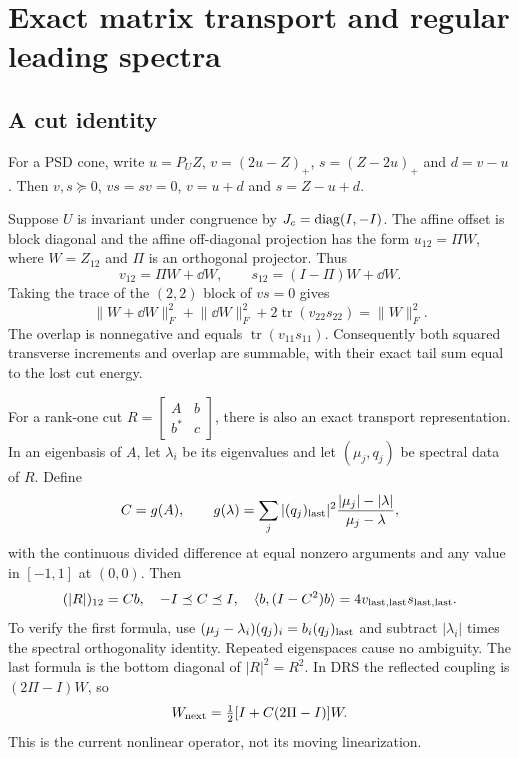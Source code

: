 \documentclass[11pt]{article}
\theoremstyle{remark}\newtheorem{remark}[theorem]{Remark}
\newcommand{\ip}[2]{\langle #1,#2\rangle}\newcommand{\norm}[1]{\lVert #1\rVert}
\newcommand{\tr}{\operatorname{tr}}\newcommand{\dist}{\operatorname{dist}}
\numberwithin{equation}{section}
\begin{document}
\section{Exact matrix transport and regular leading spectra}
\subsection{A cut identity}
For a PSD cone, write $u=P_UZ$, $v=(2u-Z)_+$, $s=(Z-2u)_+$ and $d=v-u$. Then $v,s\succeq0$, $vs=sv=0$, $v=u+d$ and $s=Z-u+d$.

Suppose $U$ is invariant under congruence by $J_c=\operatorname{diag}(I,-I)$. The affine offset is block diagonal and the affine off-diagonal projection has the form $u_{12}=\Pi W$, where $W=Z_{12}$ and $\Pi$ is an orthogonal projector. Thus
\[
 v_{12}=\Pi W+\dd W,\qquad s_{12}=(I-\Pi)W+\dd W.
\]
Taking the trace of the $(2,2)$ block of $vs=0$ gives
\begin{equation}\label{eq:cut}
 \norm{W+\dd W}_F^2+\norm{\dd W}_F^2
 +2\tr(v_{22}s_{22})=\norm W_F^2.
\end{equation}
The overlap is nonnegative and equals $\tr(v_{11}s_{11})$. Consequently both squared transverse increments and overlap are summable, with their exact tail sum equal to the lost cut energy.

For a rank-one cut $R=\left[\begin{smallmatrix}A&b\\b^*&c\end{smallmatrix}\right]$, there is also an exact transport representation. In an eigenbasis of $A$, let $\lambda_i$ be its eigenvalues and let $(\mu_j,q_j)$ be spectral data of $R$. Define
\[
 C=g(A),\qquad g(\lambda)=\sum_j |(q_j)_{\rm last}|^2
 \frac{|\mu_j|-|\lambda|}{\mu_j-\lambda},
\]
with the continuous divided difference at equal nonzero arguments and any value in $[-1,1]$ at $(0,0)$. Then
\begin{equation}\label{eq:transport}
 (|R|)_{12}=Cb,\quad -I\preceq C\preceq I,\quad
 \ip b{(I-C^2)b}=4v_{\rm last,last}s_{\rm last,last}.
\end{equation}
To verify the first formula, use $(\mu_j-\lambda_i)(q_j)_i=b_i(q_j)_{\rm last}$ and subtract $|\lambda_i|$ times the spectral orthogonality identity. Repeated eigenspaces cause no ambiguity. The last formula is the bottom diagonal of $|R|^2=R^2$. In DRS the reflected coupling is $(2\Pi-I)W$, so
\[
 W_{\rm next}=\tfrac12[I+C(2\Pi-I)]W.
\]
This is the current nonlinear operator, not its moving linearization.
\end{document}
